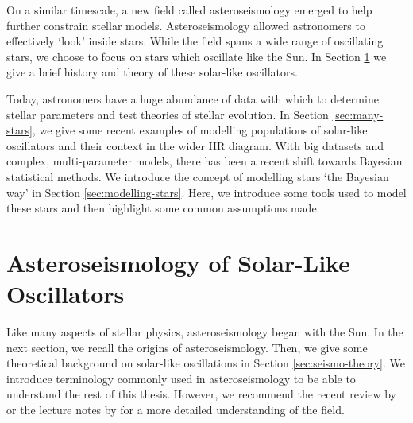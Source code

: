 On a similar timescale, a new field called asteroseismology emerged to help further constrain stellar models. Asteroseismology allowed astronomers to effectively `look' inside stars. While the field spans a wide range of oscillating stars, we choose to focus on stars which oscillate like the Sun. In Section \ref{sec:seismo} we give a brief history and theory of these solar-like oscillators.


Today, astronomers have a huge abundance of data with which to determine stellar parameters and test theories of stellar evolution. In Section \ref{sec:many-stars}, we give some recent examples of modelling populations of solar-like oscillators and their context in the wider HR diagram. With big datasets and complex, multi-parameter models, there has been a recent shift towards Bayesian statistical methods. We introduce the concept of modelling stars `the Bayesian way' in Section \ref{sec:modelling-stars}. Here, we introduce some tools used to model these stars and then highlight some common assumptions made.





\section[Solar-Like Oscillators]{Asteroseismology of Solar-Like Oscillators}\label{sec:seismo}

Like many aspects of stellar physics, asteroseismology began with the Sun. In the next section, we recall the origins of asteroseismology. Then, we give some theoretical background on solar-like oscillations in Section \ref{sec:seismo-theory}. We introduce terminology commonly used in asteroseismology to be able to understand the rest of this thesis. However, we recommend the recent review by \citet{Aerts2021} or the lecture notes by \citet{Christensen-Dalsgaard2014} for a more detailed understanding of the field.

